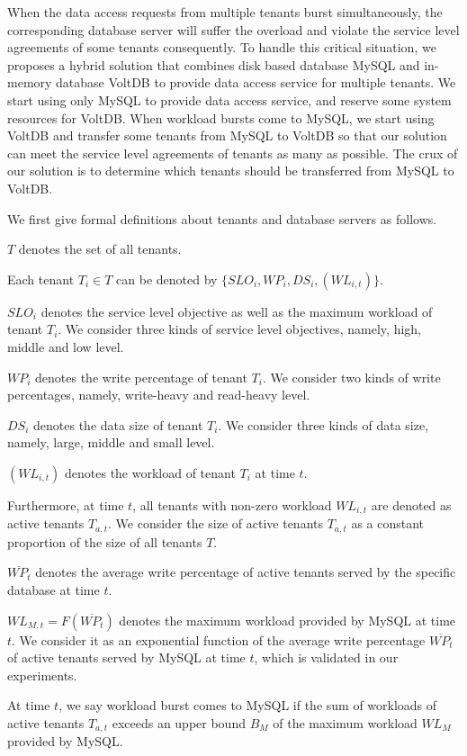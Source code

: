 \documentclass{article}
\begin{document}
When the data access requests from multiple tenants burst simultaneously, the corresponding database server will suffer the overload and violate the service level agreements of some tenants consequently. To handle this critical situation, we proposes a hybrid solution that combines disk based database MySQL and in-memory database VoltDB to provide data access service for multiple tenants. We start using only MySQL to provide data access service, and reserve some system resources for VoltDB. When workload bursts come to MySQL, we start using VoltDB and transfer some tenants from MySQL to VoltDB so that our solution can meet the service level agreements of tenants as many as possible. The crux of our solution is to determine which tenants should be transferred from MySQL to VoltDB.

We first give formal definitions about tenants and database servers as follows.

$T$ denotes the set of all tenants.

Each tenant $T_i \in T$ can be denoted by $\{SLO_i, WP_i, DS_i, (WL_{i, t})\}$.

$SLO_i$ denotes the service level objective as well as the maximum workload of tenant $T_i$. We consider three kinds of service level objectives, namely, high, middle and low level.

$WP_i$ denotes the write percentage of tenant $T_i$. We consider two kinds of write percentages, namely, write-heavy and read-heavy level.

$DS_i$ denotes the data size of tenant $T_i$. We consider three kinds of data size, namely, large, middle and small level.

$(WL_{i, t})$ denotes the workload of tenant $T_i$ at time $t$.

Furthermore, at time $t$, all tenants with non-zero workload $WL_{i, t}$ are denoted as active tenants $T_{a, t}$. We consider the size of active tenants $T_{a, t}$ as a constant proportion of the size of all tenants $T$.

$\overline{WP_t}$ denotes the average write percentage of active tenants served by the specific database at time $t$.

$WL_{M, t} = F(\overline{WP_t})$ denotes the maximum workload provided by MySQL at time $t$. We consider it as an exponential function of the average write percentage $\overline{WP_t}$ of active tenants served by MySQL at time $t$, which is validated in our experiments.

At time $t$, we say workload burst comes to MySQL if the sum of workloads of active tenants $T_{a, t}$ exceeds an upper bound $B_M$ of the maximum workload $WL_M$ provided by MySQL.
\end{document}

